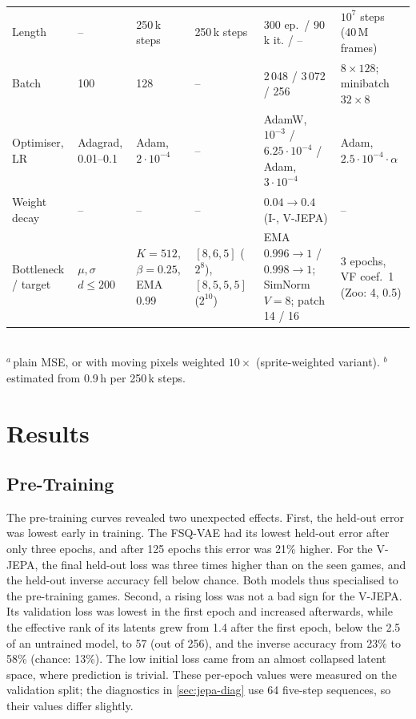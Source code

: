 \documentclass[runningheads]{llncs}
\begin{document}
\begin{table}[!htbp]
\begin{tabular}{@{}Y{1.3cm}Y{1.7cm}Y{1.7cm}Y{1.7cm}Y{2.6cm}Y{1.8cm}@{}}
Length & -- & 250\,k steps & 250\,k steps & 300 ep.\ / 90\,k it. / -- & $10^7$ steps (40\,M frames) \\
Batch & 100 & 128 & -- & 2\,048 / 3\,072 / 256 & $8\times128$; minibatch $32\times8$ \\
Optimiser, LR & Adagrad, 0.01--0.1 & Adam, $2{\cdot}10^{-4}$ & -- & AdamW, $10^{-3}$ / $6.25{\cdot}10^{-4}$ / Adam, $3{\cdot}10^{-4}$ &
  Adam, $2.5{\cdot}10^{-4}\cdot\alpha$ \\
Weight decay & -- & -- & -- & $0.04\to0.4$ (I-, V-JEPA) & -- \\
Bottleneck / target & $\mu, \sigma$ $d{\le}200$ & $K{=}512$, $\beta{=}0.25$, EMA 0.99 & $[8,6,5]$ ($2^8$), $[8,5,5,5]$ ($2^{10}$) &
  EMA $0.996\to1$ / $0.998\to1$; SimNorm $V{=}8$; patch 14 / 16 & 3 epochs, VF coef.\ 1 (Zoo: 4, 0.5) \\
\bottomrule
\end{tabular}\\[2pt]
{\scriptsize $^{a}$\,plain MSE, or with moving pixels weighted $10\times$ (sprite-weighted variant).
$^{b}$\,estimated from 0.9\,h per 250\,k steps.}
\end{table}

\section{Results}
\label{sec:results}

\FloatBarrier
\subsection{Pre-Training}
\label{sec:pretrain-res}

The pre-training curves revealed two unexpected effects. First, the
held-out error was lowest early in training. The FSQ-VAE had its lowest
held-out error after only three epochs, and after 125 epochs this error was 21\% higher. For the
V-JEPA, the final held-out loss was three times higher than on the seen games, and the held-out
inverse accuracy fell below chance. Both models thus specialised to the pre-training games. Second, a rising loss was not a bad sign for the V-JEPA. Its validation
loss was lowest in the first epoch and increased afterwards, while the effective rank of its
latents grew from 1.4 after the first epoch, below the 2.5 of an untrained model, to 57 (out of
256), and the inverse accuracy from 23\% to 58\% (chance: 13\%). The low initial loss came from
an almost collapsed latent space, where prediction is trivial. These per-epoch values were
measured on the validation split; the diagnostics in \cref{sec:jepa-diag} use 64 five-step
sequences, so their values differ slightly.
\end{document}

